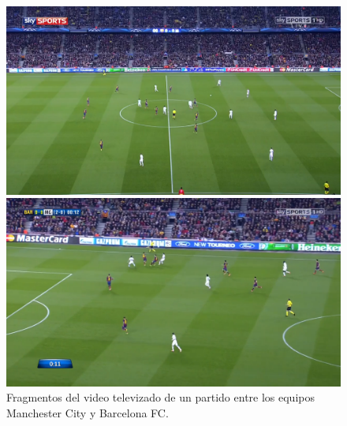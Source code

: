 \begin{figure}[H]
    \centering
    \begin{minipage}[t]{.45\textwidth}
        \centering
        \includegraphics[width=\linewidth]{./images/manchester1.png}
    \end{minipage}%
    \vspace{0.1cm}
    \begin{minipage}[t]{.45\textwidth}
        \centering
        \includegraphics[width=\linewidth]{./images/manchester2.png}
    \end{minipage}
    \caption{Fragmentos del video televizado de un partido entre los equipos Manchester City y Barcelona FC.
        \label{fig:manchester1}}
\end{figure}

